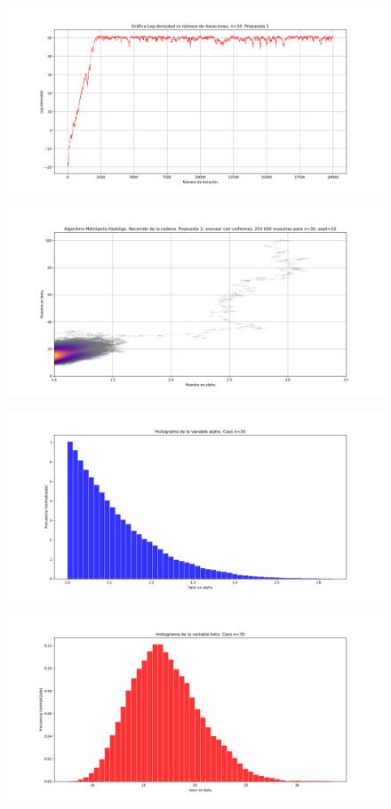 \documentclass[letterpaper]{article}
\newcommand{\1}{\mathds{1}}
\theoremstyle{definition}
\theoremstyle{definition}
\theoremstyle{definition}
\theoremstyle{definition}
\theoremstyle{definition}
\begin{document}
\begin{figure}[h!]
    \centering
    \includegraphics[width=\linewidth]{13.png}
    \caption{}
\end{figure} 
\begin{figure}[h!]
    \centering
    \includegraphics[width=\linewidth]{14.png}
    \caption{}
\end{figure} 
\begin{figure}[h!]
    \centering
    \includegraphics[width=\linewidth]{15.png}
    \caption{}
\end{figure} 
\begin{figure}[h!]
    \centering
    \includegraphics[width=\linewidth]{16.png}
    \caption{}
\end{figure} 
\end{document}
